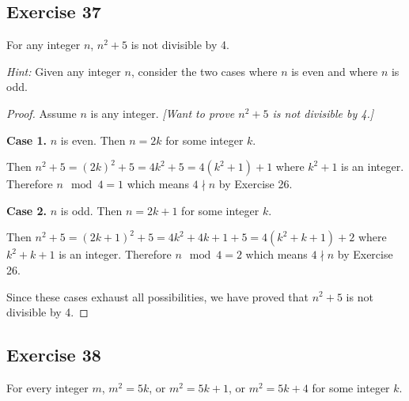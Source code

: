 \documentclass[14pt]{extarticle}
\begin{document}
\subsection{Exercise 37}
For any integer $n$, $n^2 + 5$ is not divisible by 4.

    {\it Hint:} Given any integer $n$, consider the two cases where $n$ is even and where $n$ is odd.

\begin{proof}
    Assume $n$ is any integer. {\it [Want to prove $n^2+5$ is not divisible by 4.]}

        {\bf Case 1.} $n$ is even. Then $n = 2k$ for some integer $k$.

    Then $n^2+5 = (2k)^2+5 = 4k^2+5 = 4(k^2+1)+1$ where $k^2+1$ is an integer. Therefore $n \mod 4 = 1$ which means $4 \nmid n$ by Exercise 26.

        {\bf Case 2.} $n$ is odd. Then $n = 2k+1$ for some integer $k$.

    Then $n^2+5 = (2k+1)^2+5 = 4k^2+4k+1+5 = 4(k^2+k+1)+2$ where $k^2+k+1$ is an integer. Therefore $n \mod 4 = 2$ which means $4 \nmid n$ by Exercise 26.

    Since these cases exhaust all possibilities, we have proved that $n^2+5$ is not divisible by 4.
\end{proof}

\subsection{Exercise 38}
For every integer $m$, $m^2 = 5k$, or $m^2 = 5k + 1$, or $m^2 = 5k + 4$ for some integer $k$.
\end{document}
